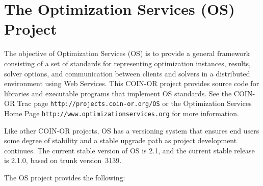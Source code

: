 \documentclass[11pt]{article}
\renewcommand{\_}{{\char"5F}}
\renewcommand{\{}{{\char"7B}}
\renewcommand{\}}{{\char"7D}}
\renewcommand{\^}{{\char"0D}}
\renewcommand{\'}{{\char"0D}}
\newcommand{\UrlOs}{http://www.optimizationservices.org}
\newcommand{\UrlTrac}{http://projects.coin-or.org/OS}
\newcommand{\OSstable}{2.1}
\newcommand{\OSrelease}{2.1.0}
\newcommand{\OStrunk}{3139}
\begin{document}
\newpage
\tableofcontents
\listoffigures
\listoftables
{}



\newpage

\section{The Optimization Services (OS) Project}

The objective of Optimization Services (OS) is to provide a general framework consisting of a set of standards
for representing optimization instances, results, solver options, and communication between clients and solvers
in a distributed environment using Web Services. This COIN-OR project provides source code for libraries and
executable programs that implement OS standards.  See the COIN-OR Trac page {\tt\UrlTrac}
or the Optimization Services Home Page {\tt\UrlOs} for more information.

Like other COIN-OR projects, OS has a versioning system that ensures end users some degree of stability 
and a stable upgrade path as project development continues. The current stable version of OS is \OSstable, 
and the current stable release is \OSrelease{}, based on trunk version~\OStrunk.

The OS project provides the following:
\end{document}

